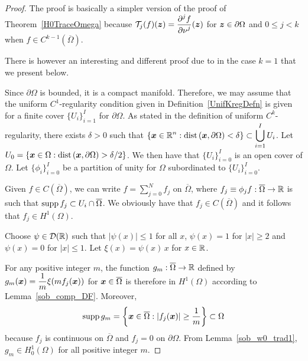 \begin{proof}
The proof is basically a simpler version of the proof
of Theorem~\ref{H0TraceOmega} because
$\displaystyle \mathcal{T}_j(f)({\bm{z}}) = \frac{\displaystyle \partial^{j}{f}} {\displaystyle \partial \nu^{j}}({\bm{z}})$ for
${\bm{z}} \in \partial \Omega$ and $0 \leq j < k$ when
$\displaystyle f \in C^{k-1}\left(\overline{\Omega}\right)$.

There is however an interesting and different proof due to \cite{Br}
in the case $k=1$ that we present below.

Since $\partial \Omega$ is bounded, it is a compact manifold.
Therefore, we may assume that the uniform $C^1$-regularity condition
given in Definition~\ref{UnifKregDefn} is
given for a finite cover
$\displaystyle \{ U_i \}_{i=1}^I$ for $\partial \Omega$.
As stated in the definition of uniform $\displaystyle C^k$-regularity,
there exists $\delta>0$ such that
$\displaystyle \left\{ {\bm{x}} \in \mathbb{R}^n :
\mathrm{dist}\left({\bm{x}},\partial \Omega\right)  < \delta \right\} \subset
\bigcup_{i=1}^I U_i$.
Let $\displaystyle U_0 = \left\{ {\bm{x}} \in \Omega :
\mathrm{dist}\left({\bm{x}},\partial \Omega\right)  > \delta/2 \right\}$.
We then have that $\displaystyle \{ U_i \}_{i=0}^I$ is an open cover of
$\Omega$.
Let $\displaystyle \{ \phi_i \}_{i=0}^I$ be a partition of unity for
$\Omega$ subordinated to $\displaystyle \{ U_i \}_{i=0}^I$.

Given $\displaystyle f \in C(\overline{\Omega})$, we can write 
$\displaystyle f = \sum_{j=0}^N f_j$ on $\overline{\Omega}$,
where $f_j \equiv \phi_j f :\overline{\Omega} \rightarrow \mathbb{R}$ is such that
$\operatorname{supp} f_j \subset U_i \cap \overline{\Omega}$.
We obviously have that $\displaystyle f_j \in C\left(\overline{\Omega}\right)$
and it follows that $\displaystyle f_j \in H^1(\Omega)$.

\stage{$\mathbf{\Leftarrow}$}
Choose $\displaystyle \psi \in \mathcal{D}(\mathbb{R})$ such that
$|\psi(x)|\leq 1$ for all $x$, $\psi(x) = 1$ for $|x|\geq 2$ and
$\psi(x) = 0$ for $|x|\leq 1$.  Let
$\xi(x) = \psi(x)\,x$ for $x \in \mathbb{R}$.

For any positive integer $m$, the function
$g_m:\overline{\Omega}\rightarrow \mathbb{R}$ defined
by $\displaystyle g_m({\bm{x}}) = \frac{1}{m}\xi(mf_j({\bm{x}}))$ for
${\bm{x}}\in \overline{\Omega}$ is therefore in $\displaystyle H^1(\Omega)$
according to Lemma~\ref{sob_comp_DF}.  Moreover,
\[
\operatorname{supp} g_m = \left\{ {\bm{x}} \in \overline{\Omega} : |f_j({\bm{x}})| \geq \frac{1}{m}
\right\} \subset \Omega
\]
because $f_j$ is continuous on $\overline{\Omega}$ and $f_j = 0$ on
$\partial \Omega$.  From Lemma~\ref{sob_w0_trad1},
$\displaystyle g_m \in H^1_0(\Omega)$ for all positive integer $m$.


\end{proof}

